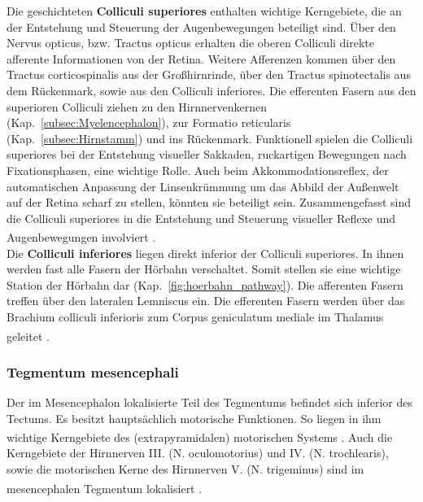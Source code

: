 \documentclass[12pt,a4paper,pdftex]{article}
\begin{document}
\noindent Die geschichteten \textbf{Colliculi superiores} enthalten wichtige Kerngebiete, die an der Entstehung und Steuerung der Augenbewegungen beteiligt sind. Über den Nervus opticus, bzw. Tractus opticus erhalten die oberen Colliculi direkte afferente Informationen von der Retina. Weitere Afferenzen kommen über den Tractus corticospinalis aus der Großhirnrinde, über den Tractus spinotectalis aus dem Rückenmark, sowie aus den Colliculi inferiores. Die efferenten Fasern aus den superioren Colliculi ziehen zu den Hirnnervenkernen (Kap.~\ref{subsec:Myelencephalon}), zur Formatio reticularis (Kap.~\ref{subsec:Hirnstamm}) und ins Rückenmark. Funktionell spielen die Colliculi superiores bei der Entstehung visueller Sakkaden, ruckartigen Bewegungen nach Fixationsphasen, eine wichtige Rolle. Auch beim  Akkommodationsreflex, der automatischen Anpassung der Linsenkrümmung um das Abbild der Außenwelt auf der Retina scharf zu stellen, könnten sie beteiligt sein. Zusammengefasst sind die Colliculi superiores in die Entstehung und Steuerung visueller Reflexe und Augenbewegungen involviert \textsuperscript{\cite[6]{trepel2011neuroanatomie}}.\\

\noindent Die \textbf{Colliculi inferiores} liegen direkt inferior der Colliculi superiores. In ihnen werden fast alle Fasern der Hörbahn verschaltet. Somit stellen sie eine wichtige Station der Hörbahn dar (Kap.~\ref{fig:hoerbahn_pathway}). Die afferenten Fasern treffen über den lateralen Lemniscus ein. Die efferenten Fasern werden über das Brachium colliculi inferioris zum Corpus geniculatum mediale im Thalamus geleitet \textsuperscript{\cite[6]{trepel2011neuroanatomie}}.


\subsubsection{Tegmentum mesencephali}

Der im Mesencephalon lokalisierte Teil des Tegmentums befindet sich inferior des Tectums. Es besitzt hauptsächlich motorische Funktionen. So liegen in ihm wichtige Kerngebiete des (extrapyramidalen) motorischen Systems \textsuperscript{\cite[14]{penzlin2005tierphys}}.
Auch die Kerngebiete der Hirnnerven III. (N. oculomotorius) und IV. (N. trochlearis), sowie die motorischen Kerne des Hirnnerven V. (N. trigeminus) sind im mesencephalen Tegmentum lokalisiert \textsuperscript{\cite[6]{trepel2011neuroanatomie}}.\\
\end{document}
